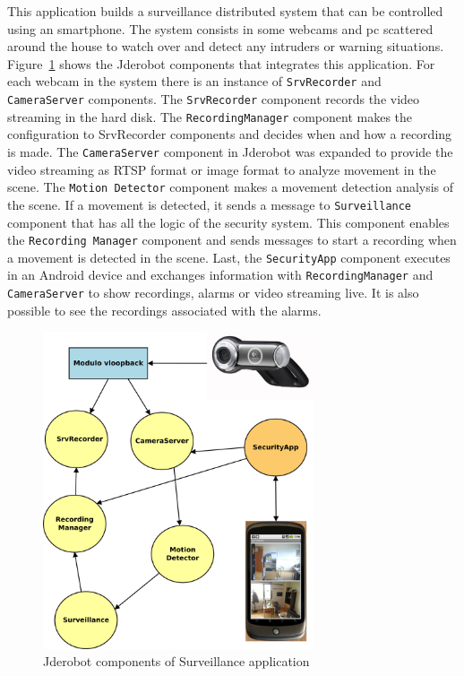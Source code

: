 \documentclass[twocolumn]{svjour3}          %
\begin{document}
This application builds a surveillance distributed system that can be controlled using an smartphone. The system consists in some webcams and pc scattered around the house to watch over and detect any intruders or warning situations. Figure~\ref{fig:surveillance1} shows the Jderobot components that integrates this application. For each
webcam in the system there is an instance of \texttt{SrvRecorder} and
\texttt{CameraServer} components. The \texttt{SrvRecorder} component records the video streaming in the hard disk. The
\texttt{RecordingManager} component makes the configuration to
{SrvRecorder} components and decides when and how a recording is
made. The \texttt{CameraServer} component in Jderobot was expanded to provide the video streaming as
RTSP format or image format to analyze movement in the scene. The \texttt{Motion Detector} component makes a movement detection analysis of the scene. If a movement is detected, it sends a message to \texttt{Surveillance} component that has all the logic of the security system. This component enables the \texttt{Recording Manager} component and sends messages to start a recording when a movement is detected in the scene. Last, the \texttt{SecurityApp} component executes in an Android device and exchanges information with \texttt{RecordingManager} and
\texttt{CameraServer} to show recordings, alarms or video streaming live. It is also possible to see the recordings associated with the alarms. 

\begin{figure}
\begin{center}
\includegraphics[width=8cm]{surveillance-img1.png}
\caption{Jderobot components of Surveillance application}
\end{center}
\label{fig:surveillance1}
\end{figure}
\end{document}
